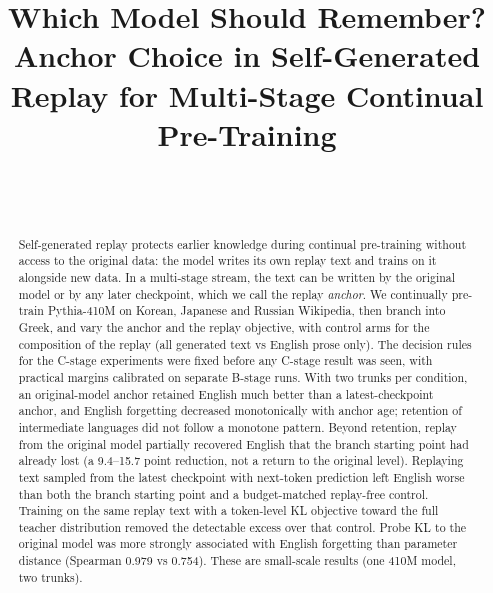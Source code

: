\documentclass[11pt]{article}
\title{Which Model Should Remember? Anchor Choice in Self-Generated Replay for Multi-Stage Continual Pre-Training}
\author{\paperauthor\\ \paperaffil\ifx\paperemail\empty\else\\ \texttt{\paperemail}\fi}
\date{}
\begin{document}
\maketitle





\begin{abstract}

Self-generated replay protects earlier knowledge during continual pre-training without access to the original data: the model writes its own replay text and trains on it alongside new data. In a multi-stage stream, the text can be written by the original model or by any later checkpoint, which we call the replay \emph{anchor}. We continually pre-train Pythia-410M on Korean, Japanese and Russian Wikipedia, then branch into Greek, and vary the anchor and the replay objective, with control arms for the composition of the replay (all generated text vs English prose only). The decision rules for the C-stage experiments were fixed before any C-stage result was seen, with practical margins calibrated on separate B-stage runs. With two trunks per condition, an original-model anchor retained English much better than a latest-checkpoint anchor, and English forgetting decreased monotonically with anchor age; retention of intermediate languages did not follow a monotone pattern. Beyond retention, replay from the original model partially recovered English that the branch starting point had already lost (a 9.4–15.7 point reduction, not a return to the original level). Replaying text sampled from the latest checkpoint with next-token prediction left English worse than both the branch starting point and a budget-matched replay-free control. Training on the same replay text with a token-level KL objective toward the full teacher distribution removed the detectable excess over that control. Probe KL to the original model was more strongly associated with English forgetting than parameter distance (Spearman 0.979 vs 0.754). These are small-scale results (one 410M model, two trunks).


\end{abstract}
\end{document}
